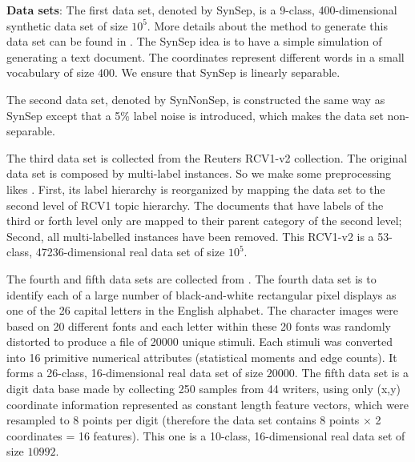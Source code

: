 \documentclass[preprint,12pt,authoryear]{elsarticle}
\begin{document}
\textbf{Data sets}:
The first data set, denoted by SynSep,  is a 9-class, 400-dimensional synthetic data set of size $10^5$. More details about the method to generate this data set can be found in \cite{kakade2008efficient}. The SynSep  idea is to have a simple simulation of generating a text document. The coordinates represent different words in a small vocabulary of size $400$. We ensure that SynSep is linearly separable. 

The second data set, denoted by SynNonSep, is constructed  the same way as  SynSep except that a 5\% label noise is introduced, which makes the data set non-separable. 

The third data set is collected from the Reuters RCV1-v2 collection\cite{David04RCV}. The original data set is composed by multi-label instances. So we make some preprocessing likes \cite{RB08a}. First, its label hierarchy is reorganized by mapping the data set to the second level of RCV1 topic hierarchy. The documents that have labels of the third or forth level only are mapped to their parent category of the second level; Second, all multi-labelled instances have been removed. This RCV1-v2 is a 53-class,  47236-dimensional real data set of size $10^5$. 

The fourth and fifth data sets are collected from \cite{letter26SC,number10SC}. The fourth data set is to identify each of a large number of black-and-white rectangular pixel displays as one of the 26 capital letters in the English alphabet. The character images were based on 20 different fonts and each letter within these 20 fonts was randomly distorted to produce a file of 20000 unique stimuli. Each stimuli was converted into 16 primitive numerical attributes (statistical moments and edge counts). It forms a 26-class, 16-dimensional real data set of size $20000$. The fifth data set is a digit data base made by collecting 250 samples from 44 writers, using only (x,y) coordinate information represented as constant length feature vectors, which were resampled to 8 points per digit (therefore the data set contains 8 points $\times$ 2 coordinates = 16 features). This one is a 10-class, 16-dimensional real data set of size $10992$.
\end{document}
